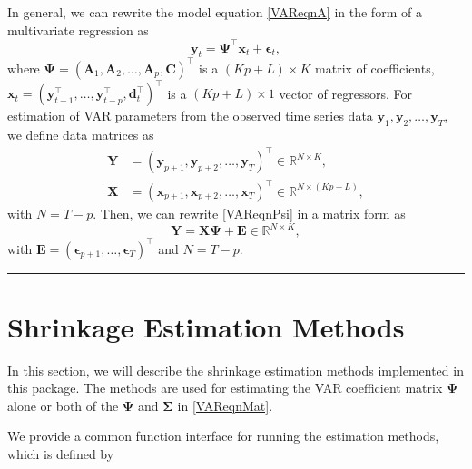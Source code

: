 \documentclass[
]{jss}
\begin{document}
In general, we can rewrite the model equation \eqref{VAReqnA} in the
form of a multivariate regression as
\begin{equation}    \label{VAReqnPsi}
    \mathbf{y}_t    =   \mathbf{\Psi}^\top \mathbf{x}_t + \boldsymbol{\epsilon}_t,
    \end{equation} where
\(\mathbf{\Psi} = (\mathbf{A}_1, \mathbf{A}_2, \ldots, \mathbf{A}_p, \mathbf{C})^\top\)
is a \((Kp + L) \times K\) matrix of coefficients,
\(\mathbf{x}_t = (\mathbf{y}_{t-1}^\top, \ldots, \mathbf{y}_{t-p}^\top, \mathbf{d}_t^\top)^\top\)
is a \((Kp + L)\times 1\) vector of regressors. For estimation of VAR
parameters from the observed time series data
\(\mathbf{y}_1, \mathbf{y}_2, \ldots, \mathbf{y}_T\), we define data
matrices as \begin{equation}
    \begin{split}
    \mathbf{Y} &= ( \mathbf{y}_{p+1}, \mathbf{y}_{p+2}, \ldots, \mathbf{y}_{T} )^\top \in \mathbb{R}^{N \times K},
    \\
    \mathbf{X} &= ( \mathbf{x}_{p+1}, \mathbf{x}_{p+2}, \ldots, \mathbf{x}_{T} )^\top \in \mathbb{R}^{N \times (Kp + L)},
    \end{split}
    \end{equation} with \(N = T-p\). Then, we can rewrite
\eqref{VAReqnPsi} in a matrix form as \begin{equation}
    \label{VAReqnMat}
    \mathbf{Y} = \mathbf{X} \mathbf{\Psi} + \mathbf{E} \in \mathbb{R}^{N \times K},
    \end{equation} with
\(\mathbf{E} = (\boldsymbol\epsilon_{p+1}, \ldots, \boldsymbol\epsilon_T)^\top\)
and \(N = T-p\).

\begin{center}\rule{0.5\linewidth}{\linethickness}\end{center}

\hypertarget{sec:methods}{%
\section{Shrinkage Estimation Methods}\label{sec:methods}}

In this section, we will describe the shrinkage estimation methods
implemented in this package. The methods are used for estimating the VAR
coefficient matrix \(\mathbf{\Psi}\) alone or both of the
\(\mathbf{\Psi}\) and \(\mathbf{\Sigma}\) in \eqref{VAReqnMat}.

We provide a common  function interface 
for running the estimation methods, which is defined by
\end{document}
